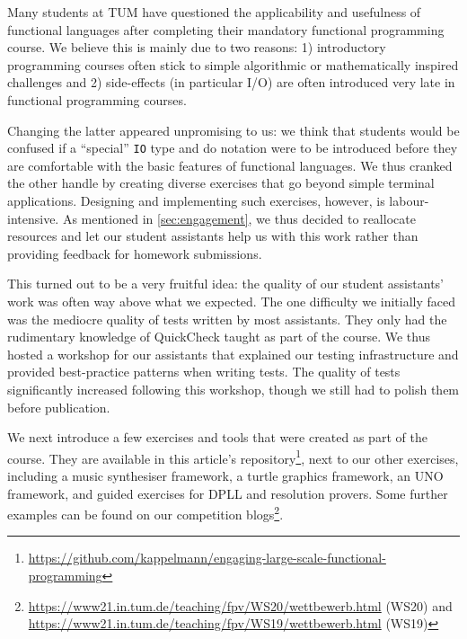 Many students at TUM have questioned the
applicability and usefulness
of functional languages after completing
their mandatory functional programming course.
We believe this is mainly due to two reasons:
1) introductory programming courses often stick
to simple algorithmic or mathematically inspired challenges and
2) side-effects (in particular I/O)
are often introduced very late
in functional programming courses.

Changing the latter appeared unpromising to us:
we think that students would be confused
if a ``special'' \texttt{IO} type and do notation were to
be introduced before they are comfortable
with the basic features of functional
languages.
We thus cranked the other handle
by creating diverse exercises that go beyond
simple terminal applications.
Designing and implementing such exercises,
however, is labour-intensive.
As mentioned in \cref{sec:engagement},
we thus decided to reallocate resources and
let our student assistants help us with this work
rather than providing feedback for homework submissions.

This turned out to be a very fruitful idea:
the quality of our student assistants' work was often way above what
we expected.
The one difficulty we initially faced was the mediocre quality of
tests written by most assistants.
They only had the rudimentary knowledge of QuickCheck taught as part of
the course.
We thus hosted a workshop for our assistants that explained
our testing infrastructure and provided best-practice
patterns when writing tests.
The quality of tests significantly increased following this workshop,
though we still had to polish them before publication.

We next introduce a few exercises and tools
that were created as part of the course.
They are available in this article's repository\footnote{\url{https://github.com/kappelmann/engaging-large-scale-functional-programming}},
next to our other exercises, including
a music synthesiser framework,
a turtle graphics framework,
an UNO framework,
and guided exercises for DPLL and resolution provers.
Some further examples can be found on our competition blogs\footnote{\url{https://www21.in.tum.de/teaching/fpv/WS20/wettbewerb.html} (WS20) and
\url{https://www21.in.tum.de/teaching/fpv/WS19/wettbewerb.html} (WS19)}.

